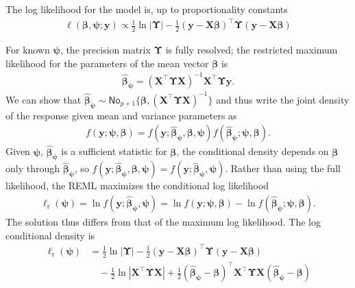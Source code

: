 \documentclass[
  11pt,
  letterpaper,
]{book}
\theoremstyle{definition}
\theoremstyle{definition}
\theoremstyle{definition}
\theoremstyle{remark}
\begin{document}
The log likelihood for the model is, up to proportionality constants
\begin{align*}
\ell(\boldsymbol{\beta},\boldsymbol{\psi}; \boldsymbol{y}) \propto  \frac{1}{2} \ln |\boldsymbol{\Upsilon}|- \frac{1}{2} (\boldsymbol{y}- \mathbf{X}\boldsymbol{\beta})^\top\boldsymbol{\Upsilon}(\boldsymbol{y}-\mathbf{X}\boldsymbol{\beta}) 
\end{align*}

For known \(\boldsymbol{\psi}\), the precision matrix \(\boldsymbol{\Upsilon}\) is fully resolved; the restricted maximum likelihood for the parameters of the mean vector \(\boldsymbol{\beta}\) is
\begin{align*}
\widehat{\boldsymbol{\beta}}_{\boldsymbol{\psi}} = (\mathbf{X}^\top\boldsymbol{\Upsilon}\mathbf{X})^{-1}\mathbf{X}^\top\boldsymbol{\Upsilon}\boldsymbol{y}.
\end{align*}
We can show that \(\widehat{\boldsymbol{\beta}}_{\boldsymbol{\psi}} \sim \mathsf{No}_{p+1}\{\boldsymbol{\beta}, (\mathbf{X}^\top\boldsymbol{\Upsilon}\mathbf{X})^{-1}\}\) and thus write the joint density of the response given mean and variance parameters as
\begin{align*}
f(\boldsymbol{y}; \boldsymbol{\psi}, \boldsymbol{\beta}) = f(\boldsymbol{y}; \widehat{\boldsymbol{\beta}}_{\boldsymbol{\psi}}, \boldsymbol{\beta}, \boldsymbol{\psi}) f(\widehat{\boldsymbol{\beta}}_{\boldsymbol{\psi}}; \boldsymbol{\psi}, \boldsymbol{\beta}). 
\end{align*}
Given \(\boldsymbol{\psi}\), \(\widehat{\boldsymbol{\beta}}_{\boldsymbol{\psi}}\) is a sufficient statistic for \(\boldsymbol{\beta}\), the conditional density depends on \(\boldsymbol{\beta}\) only through \(\widehat{\boldsymbol{\beta}}_{\boldsymbol{\psi}}\), so \(f(\boldsymbol{y}; \widehat{\boldsymbol{\beta}}_{\boldsymbol{\psi}}, \boldsymbol{\beta}, \boldsymbol{\psi}) = f(\boldsymbol{y}; \widehat{\boldsymbol{\beta}}_{\boldsymbol{\psi}}, \boldsymbol{\psi})\).
Rather than using the full likelihood, the REML maximizes the conditional log likelihood
\begin{align*}
\ell_{\mathrm{r}}(\boldsymbol{\psi})= \ln f(\boldsymbol{y}; \widehat{\boldsymbol{\beta}}_{\boldsymbol{\psi}},  \boldsymbol{\psi}) = \ln f(\boldsymbol{y}; \boldsymbol{\psi}, \boldsymbol{\beta}) - \ln f(\widehat{\boldsymbol{\beta}}_{\boldsymbol{\psi}}; \boldsymbol{\psi}, \boldsymbol{\beta}).
\end{align*}
The solution thus differs from that of the maximum log likelihood. The log conditional density is
\begin{align*}
\ell_{\mathrm{r}}(\boldsymbol{\psi})
 &= \frac{1}{2} \ln |\boldsymbol{\Upsilon}| - \frac{1}{2} (\boldsymbol{y}-\mathbf{X}\boldsymbol{\beta})^\top\boldsymbol{\Upsilon}(\boldsymbol{y}-\mathbf{X}\boldsymbol{\beta}) 
 \\& \quad - \frac{1}{2} \ln \left|\mathbf{X}^\top\boldsymbol{\Upsilon}\mathbf{X}\right| + \frac{1}{2} \left(\widehat{\boldsymbol{\beta}}_{\boldsymbol{\psi}}-\boldsymbol{\beta}\right)^\top \mathbf{X}^\top\boldsymbol{\Upsilon}\mathbf{X} \left(\widehat{\boldsymbol{\beta}}_{\boldsymbol{\psi}}-\boldsymbol{\beta}\right)
\end{align*}
\end{document}
